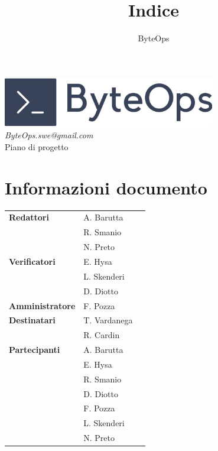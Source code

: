 \documentclass{article}
\title{\textbf{\fontsize{30}{6}\selectfont Indice}}
\author{\fontsize{14}{6}\selectfont ByteOps}
\date{}
\begin{document}
\pagestyle{fancy}
\begin{center}
\includegraphics[width = 0.7\textwidth]{../Images/logo.png} \\
\vspace{0.2cm}
\textcolor[RGB]{60, 60, 60}{\textit{ByteOps.swe@gmail.com}} \\
\vspace{1cm}
\fontsize{16}{6}\selectfont Piano di progetto \\
\vspace{0.5cm}
\end{center}

\section*{Informazioni documento}
\def\arraystretch{1.2}
\begin{tabular}{>{\raggedleft\arraybackslash}p{}|>{\raggedright\arraybackslash}p{}c}
\hline
\addlinespace
    \textbf{Redattori} & A. Barutta \\ & R. Smanio \\ & N. Preto \vspace{10pt} \\
    \textbf{Verificatori} & E. Hysa \\ & L. Skenderi \\ & D. Diotto \vspace{10pt} \\
    \textbf{Amministratore} & F. Pozza \vspace{10pt} \\
    \textbf{Destinatari} & T. Vardanega \\ & R. Cardin \vspace{10pt} \\
    \textbf{Partecipanti} & A. Barutta \\ & E. Hysa \\ & R. Smanio \\ & D. Diotto \\ & F. Pozza \\ & L. Skenderi \\ & N. Preto \vspace{10pt} \\
\end{tabular}
\pagebreak 
\end{document}
